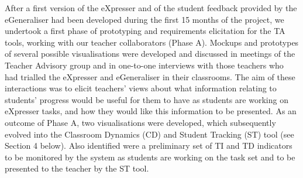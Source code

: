 After a first version of the eXpresser and of the student feedback
provided by the eGeneraliser had been developed during the first 15
months of the project, we undertook a first phase of prototyping and
requirements elicitation for the TA tools, working with our teacher
collaborators (Phase A).    %
Mockups and
prototypes of several possible visualisations were developed and
discussed in meetings of the Teacher Advisory group and in one-to-one
interviews with those teachers who had trialled the eXpresser and
eGeneraliser in their classrooms. The aim of these interactions was to
elicit teachers' views about what information relating to students'
progress would be useful for them to have as
students are working on eXpresser tasks, and how they would like this
information to be presented.  
As an outcome of Phase A, two visualisations were developed, 
which subsequently evolved into the Classroom Dynamics
(CD) and Student Tracking (ST) tool (see Section 4 below). 
Also identified were a preliminary set of TI and TD indicators
to be monitored by the system as students are working on the task
set and to be presented to the teacher by the ST tool.

